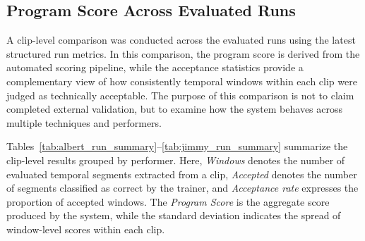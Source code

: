 \documentclass[12pt]{article}
\begin{document}
\subsection*{Program Score Across Evaluated Runs}
A clip-level comparison was conducted across the evaluated runs using the latest structured run metrics. In this comparison, the program score is derived from the automated scoring pipeline, while the acceptance statistics provide a complementary view of how consistently temporal windows within each clip were judged as technically acceptable. The purpose of this comparison is not to claim completed external validation, but to examine how the system behaves across multiple techniques and performers.

Tables~\ref{tab:albert_run_summary}--\ref{tab:jimmy_run_summary} summarize the clip-level results grouped by performer. Here, \textit{Windows} denotes the number of evaluated temporal segments extracted from a clip, \textit{Accepted} denotes the number of segments classified as correct by the trainer, and \textit{Acceptance rate} expresses the proportion of accepted windows. The \textit{Program Score} is the aggregate score produced by the system, while the standard deviation indicates the spread of window-level scores within each clip.

\begin{table}[H]
\centering
\caption{Run-level summary for Albert.}
\label{tab:albert_run_summary}
\end{table}
\end{document}
